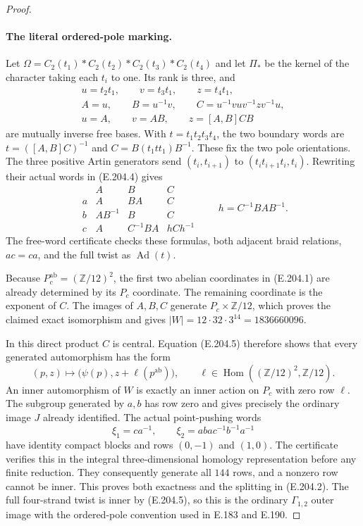 \begin{proof}
\paragraph{The literal ordered-pole marking.}
Let
$\Omega=C_2(t_1)*C_2(t_2)*C_2(t_3)*C_2(t_4)$ and let
$\Pi_*$ be the kernel of the character taking each
$t_i$ to one.  Its rank is three, and
\[
 \begin{gathered}
 u=t_2t_1,\qquad v=t_3t_1,\qquad z=t_4t_1,\\
 A=u,\qquad B=u^{-1}v,
 \qquad C=u^{-1}vuv^{-1}zv^{-1}u,\\
 u=A,\qquad v=AB,\qquad z=[A,B]CB
 \end{gathered}                                                   \tag{E.204.4}
\]
are mutually inverse free bases.  With $t=t_1t_2t_3t_4$,
the two boundary words are
$t=([A,B]C)^{-1}$ and $C=B(t_1tt_1)B^{-1}$.
These fix the two pole orientations.  The three positive
Artin generators send
$(t_i,t_{i+1})$ to $(t_it_{i+1}t_i,t_i)$.
Rewriting their actual words in (E.204.4) gives
\[
 \begin{array}{c|ccc}
 &A&B&C\\\hline
 a&A&BA&C\\
 b&AB^{-1}&B&C\\
 c&A&C^{-1}BA&hCh^{-1}
 \end{array}
 \qquad h=C^{-1}BAB^{-1}.                                        \tag{E.204.5}
\]
The free-word certificate checks these formulas, both
adjacent braid relations, $ac=ca$, and the full twist
as $\operatorname{Ad}(t)$.

Because $P_c^{\mathrm{ab}}=(\mathbb Z/12)^2$, the first
two abelian coordinates in (E.204.1) are already
determined by its $P_c$ coordinate.  The remaining
coordinate is the exponent of $C$.  The images of
$A,B,C$ generate $P_c\times\mathbb Z/12$, which proves
the claimed exact isomorphism and gives
$|W|=12\cdot32\cdot3^{14}=1836660096$.

In this direct product $C$ is central.  Equation (E.204.5)
therefore shows that every generated automorphism has
the form
\[
        (p,z)\longmapsto
          \bigl(\psi(p),z+\ell(p^{\mathrm{ab}})\bigr),
 \qquad \ell\in\operatorname{Hom}((\mathbb Z/12)^2,\mathbb Z/12).
                                                                    \tag{E.204.6}
\]
An inner automorphism of $W$ is exactly an inner action
on $P_c$ with zero row $\ell$.  The subgroup generated
by $a,b$ has row zero and gives precisely the ordinary
image $J$ already identified.  The actual point-pushing
words
\[
                \xi_1=ca^{-1},\qquad
                \xi_2=aba c^{-1}b^{-1}a^{-1}
\]
have identity compact blocks and rows $(0,-1)$ and
$(1,0)$.  The certificate verifies this in the integral
three-dimensional homology representation before any
finite reduction.  They consequently generate all
$144$ rows, and a nonzero row cannot be inner.  This
proves both exactness and the splitting in (E.204.2).
The full four-strand twist is inner by (E.204.5), so
this is the ordinary $\Gamma_{1,2}$ outer image with
the ordered-pole convention used in E.183 and E.190.


\end{proof}
